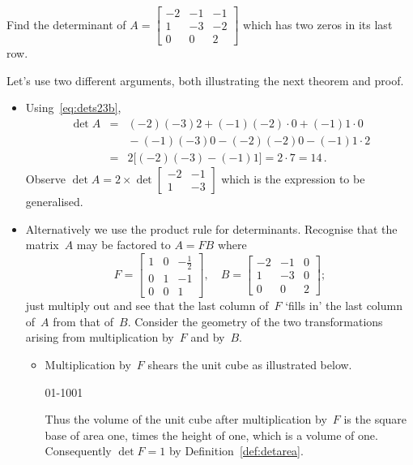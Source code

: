 \begin{example} \label{eg:}
Find the determinant of 
\(A=\begin{bmatrix} -2&-1&-1\\1&-3&-2\\0&0&2 \end{bmatrix}\)
which has two zeros in its last row.
\begin{solution} Let's use two different arguments, both illustrating the next theorem and proof.
\begin{itemize}
\item Using~\eqref{eq:dets23b},
\begin{eqnarray*}
\det A&=& (-2)(-3)2+(-1)(-2)\cdot0+(-1)1\cdot0
\\&&{}
-(-1)(-3)0-(-2)(-2)0-(-1)1\cdot2
\\&=&2\big[(-2)(-3)-(-1)1\big]=2\cdot7=14\,.
\end{eqnarray*}
Observe \(\det A=2\times\det\begin{bmatrix} -2&-1\\1&-3 \end{bmatrix}\) which is the expression to be generalised.

\item Alternatively we use the product rule for determinants. Recognise that the matrix~\(A\) may be factored to \(A=FB\) where
\begin{equation*}
F=\begin{bmatrix} 1&0&-\frac12\\0&1&-1\\0&0&1 \end{bmatrix},
\quad B=\begin{bmatrix} -2&-1&0\\1&-3&0\\0&0&2 \end{bmatrix};
\end{equation*}
just multiply out and see that the last column of~\(F\) `fills in' the last column of~\(A\) from that of~\(B\).
Consider the geometry of the two transformations arising from multiplication by~\(F\) and by~\(B\).
\begin{itemize}
\item Multiplication by~\(F\) shears the unit cube as illustrated below.
\begin{center}
01{-1}001
\end{center}
Thus the volume of the unit cube after multiplication by~\(F\) is the square base of area one, times the height of one, which is a volume of one.
Consequently \(\det F=1\) by Definition~\ref{def:detarea}.


\end{itemize}
\end{itemize}
\end{solution}
\end{example}
